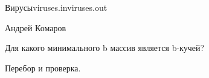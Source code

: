 ﻿\begin{proposal}{Вирусы}{viruses.in}{viruses.out}{}

\Author

Андрей Комаров

\ProblemIdea
      
Для какого минимального b массив является b-кучей?

\SolutionIdea

Перебор и проверка.

\ProblemVariations


\ProblemComplexity                              


\WrongSolutions



\end{proposal}
